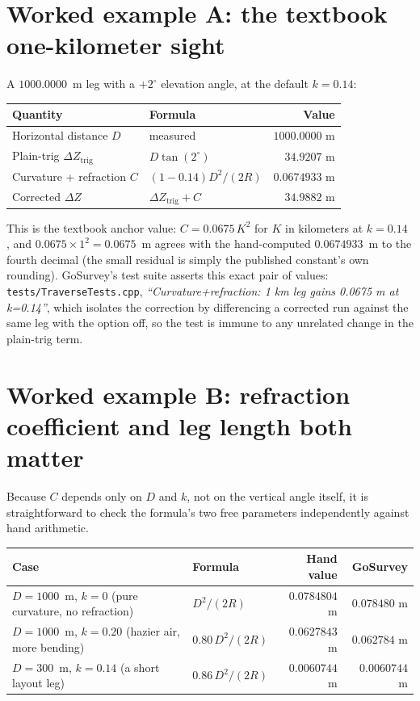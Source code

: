\documentclass[11pt]{article}
\begin{document}
\section{Worked example A: the textbook one-kilometer sight}
\label{sec:exa}

A $1000.0000$~m leg with a $+2^{\circ}$ elevation angle, at the default
$k = 0.14$:

\begin{center}
\begin{tabular}{@{}llr@{}}
\toprule
Quantity & Formula & Value \\
\midrule
Horizontal distance $D$ & measured & $1000.0000$ m \\
Plain-trig $\Delta Z_{\mathrm{trig}}$ & $D\tan(2^{\circ})$ & $34.9207$ m \\
Curvature + refraction $C$ & $(1-0.14)D^{2}/(2R)$ & $0.0674933$ m \\
Corrected $\Delta Z$ & $\Delta Z_{\mathrm{trig}} + C$ & $34.9882$ m \\
\bottomrule
\end{tabular}
\end{center}

This is the textbook anchor value: $C = 0.0675\,K^{2}$ for $K$ in kilometers
at $k=0.14$ \citep{ghilaniwolf2015}, and $0.0675 \times 1^2 = 0.0675$~m
agrees with the hand-computed $0.0674933$~m to the fourth decimal (the
small residual is simply the published constant's own rounding). GoSurvey's
test suite asserts this exact pair of values:
\texttt{tests/TraverseTests.cpp}, \emph{``Curvature+refraction: 1 km leg
gains 0.0675 m at k=0.14''}, which isolates the correction by differencing a
corrected run against the same leg with the option off, so the test is
immune to any unrelated change in the plain-trig term.

\section{Worked example B: refraction coefficient and leg length both matter}
\label{sec:exb}

Because $C$ depends only on $D$ and $k$, not on the vertical angle itself,
it is straightforward to check the formula's two free parameters
independently against hand arithmetic.

\begin{center}
\begin{tabular}{@{}L{0.30\textwidth}L{0.34\textwidth}rr@{}}
\toprule
Case & Formula & Hand value & GoSurvey \\
\midrule
$D=1000$~m, $k=0$ (pure curvature, no refraction) &
  $D^{2}/(2R)$ & $0.0784804$ m & $0.078480$ m \\
$D=1000$~m, $k=0.20$ (hazier air, more bending) &
  $0.80\,D^{2}/(2R)$ & $0.0627843$ m & $0.062784$ m \\
$D=300$~m, $k=0.14$ (a short layout leg) &
  $0.86\,D^{2}/(2R)$ & $0.0060744$ m & $0.0060744$ m \\
\bottomrule
\end{tabular}
\end{center}
\end{document}
